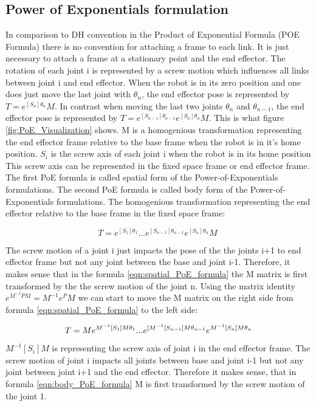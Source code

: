 \documentclass{tpk4170report}
\begin{document}
\subsection{Power of Exponentials formulation}
In comparison to DH convention in the Product of Exponential Formula (POE Formula) there is no convention for attaching a frame to each link. It is just necessary to attach a frame at a stationary point and the end effector. The rotation of each joint i is represented by a screw motion which influences all links between joint i and end effector. When the robot is in its zero position and one does just move the last joint with \(\theta_{n}\), the end effector pose is represented by \(T = e^{[S_{n}]\theta_{n}} M\). In contrast when moving the last two joints \(\theta_{n}\) and \(\theta_{n-1}\), the end effector pose is represented by \(T = e^{[S_{n-1}]\theta_{n-1}} e^{[S_{n}]\theta_{n}} M\). This is what figure \ref{fig:PoE_Visualization} shows. M is a homogenious transformation representing the end effector frame relative to the base frame when the robot is in it's home position. \(S_{i}\) is the screw axis of each joint i when the robot is in its home position This screw axis can be represented in the fixed space frame or end effector frame. The first PoE formula is called spatial form of the Power-of-Exponentials formulations. The second PoE formula is called body form of the Power-of-Exponentials formulations. The homogenious transformation representing the end effector relative to the base frame in the fixed space frame: 

\begin{equation}
  T = e^{[S_{1}]\theta_{1}} ... e^{[S_{n-1}]\theta_{n-1}} e^{[S_{n}]\theta_{n}} M\
  \label{eqn:spatial_PoE_formula}
\end{equation}

The screw motion of a joint i just impacts the pose of the the joints i+1 to end effector frame but not any joint between the base and joint i-1. Therefore, it makes sense that in the formula \ref{eqn:spatial_PoE_formula} the M matrix is first transformed by the the screw motion of the joint n. Using the matrix identity \(e^{M^{-1}PM} = M^{-1}e^{P}M\) we can start to move the M matrix on the right side from formula \ref{eqn:spatial_PoE_formula} to the left side: 

\begin{equation}
  T = M e^{M^{-1}[S_{1}]M\theta_{1}} ... e^{[M^{-1}[S_{n-1}]M\theta_{n-1}} e^{M^{-1}[S_{n}]M\theta_{n}} \\
  \label{eqn:body_PoE_formula}
\end{equation}
\(M^{-1}[S_{i}]M\) is representing the screw axis of joint i in the end effector frame. The screw motion of joint i impacts all joints between base and joint i-1 but not any joint between joint i+1 and the end effector. Therefore it makes sense, that in formula \ref{eqn:body_PoE_formula} M is first transformed by the screw motion of the joint 1. 
\end{document}
